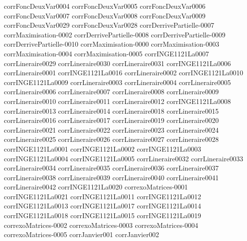 {corrFoncDeuxVar0004}
{corrFoncDeuxVar0005}
{corrFoncDeuxVar0006}
{corrFoncDeuxVar0007}
{corrFoncDeuxVar0008}
{corrFoncDeuxVar0009}
{corrFoncDeuxVar0029}
{corrFoncDeuxVar0028}
{corrDerrivePartielle-0007}
{corrMaximisation-0002}
{corrDerrivePartielle-0008}
{corrDerrivePartielle-0009}
{corrDerrivePartielle-0010}
{corrMaximisation-0000}
{corrMaximisation-0003}
{corrMaximisation-0004}
{corrMaximisation-0005}
{corrINGE1121La0007}
{corrLineraire0029}
{corrLineraire0030}
{corrLineraire0031}
{corrINGE1121La0006}
{corrLineraire0001}
{corrINGE1121La0016}
{corrLineraire0002}
{corrINGE1121La0010}
{corrINGE1121La0009}
{corrLineraire0003}
{corrLineraire0004}
{corrLineraire0005}
{corrLineraire0006}
{corrLineraire0007}
{corrLineraire0008}
{corrLineraire0009}
{corrLineraire0010}
{corrLineraire0011}
{corrLineraire0012}
{corrINGE1121La0008}
{corrLineraire0013}
{corrLineraire0014}
{corrLineraire0018}
{corrLineraire0015}
{corrLineraire0016}
{corrLineraire0017}
{corrLineraire0019}
{corrLineraire0020}
{corrLineraire0021}
{corrLineraire0022}
{corrLineraire0023}
{corrLineraire0024}
{corrLineraire0025}
{corrLineraire0026}
{corrLineraire0027}
{corrLineraire0028}
{corrINGE1121La0001}
{corrINGE1121La0002}
{corrINGE1121La0003}
{corrINGE1121La0004}
{corrINGE1121La0005}
{corrLineraire0032}
{corrLineraire0033}
{corrLineraire0034}
{corrLineraire0035}
{corrLineraire0036}
{corrLineraire0037}
{corrLineraire0038}
{corrLineraire0039}
{corrLineraire0040}
{corrLineraire0041}
{corrLineraire0042}
{corrINGE1121La0020}
{correxoMatrices-0001}
{corrINGE1121La0021}
{corrINGE1121La0011}
{corrINGE1121La0012}
{corrINGE1121La0013}
{corrINGE1121La0017}
{corrINGE1121La0014}
{corrINGE1121La0018}
{corrINGE1121La0015}
{corrINGE1121La0019}
{correxoMatrices-0002}
{correxoMatrices-0003}
{correxoMatrices-0004}
{correxoMatrices-0005}
{corrJanvier001}
{corrJanvier002}
